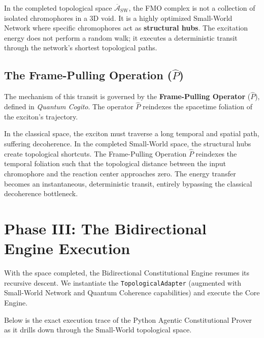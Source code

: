 \documentclass[11pt,openany]{extbook}
\theoremstyle{plain}
\theoremstyle{definition}
\begin{document}
In the completed topological space $\overline{\mathcal{A}}_{\text{SW}}$, the FMO complex is not a collection of isolated chromophores in a 3D void. It is a highly optimized Small-World Network where specific chromophores act as \textbf{structural hubs}. The excitation energy does not perform a random walk; it executes a deterministic transit through the network's shortest topological paths.

\subsection{The Frame-Pulling Operation ($\hat{P}$)}
The mechanism of this transit is governed by the \textbf{Frame-Pulling Operator} ($\hat{P}$), defined in \textit{Quantum Cogito}. The operator $\hat{P}$ reindexes the spacetime foliation of the exciton's trajectory.

In the classical space, the exciton must traverse a long temporal and spatial path, suffering decoherence. In the completed Small-World space, the structural hubs create topological shortcuts. The Frame-Pulling Operation $\hat{P}$ reindexes the temporal foliation such that the topological distance between the input chromophore and the reaction center approaches zero. The energy transfer becomes an instantaneous, deterministic transit, entirely bypassing the classical decoherence bottleneck.

\section{Phase III: The Bidirectional Engine Execution}

With the space completed, the Bidirectional Constitutional Engine resumes its recursive descent. We instantiate the \texttt{TopologicalAdapter} (augmented with Small-World Network and Quantum Coherence capabilities) and execute the Core Engine.

Below is the exact execution trace of the Python Agentic Constitutional Prover as it drills down through the Small-World topological space.
\end{document}
